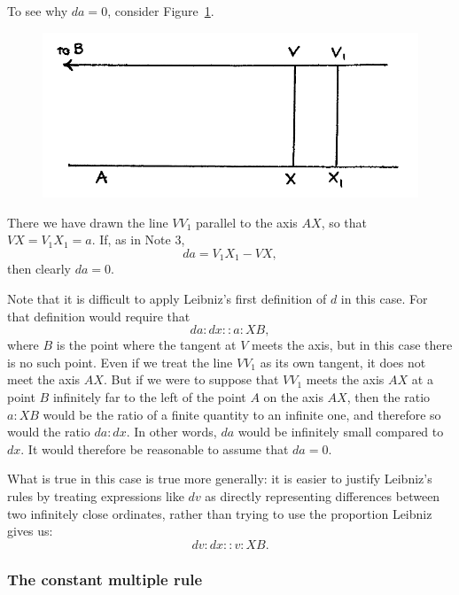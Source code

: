 \documentclass[polutonikogreek,english,twoside,openright]{article}
\begin{document}
To see why $da =0$, consider Figure~\ref{conrule}.
\begin{figure}[htp]
\begin{center}
\includegraphics[width=.75\textwidth]{fig/Figure12}
\caption{}
\label{conrule}
\vspace{-10pt}
\end{center}
\end{figure}
  There we have drawn the line $VV_1$ parallel to the axis $AX$, so that $VX =V_1X_1 = a$.   If, as in Note 3,
$$ da = V_1X_1 - VX,$$
then clearly $da =0$.

Note that it is difficult to apply Leibniz's first definition of $d$
in this case.  For that definition would require that
$$da \!:\! dx :: a \!:\! XB,$$ 
where $B$ is the point where the tangent at $V$ meets the axis, but in
this case there is no such point.  Even if we treat the line $VV_1$ as
its own tangent, it does not meet the axis $AX$.  But if we were to
suppose that $VV_1$ meets the axis $AX$ at a point $B$ infinitely far
to the left of the point $A$ on the axis $AX$, then the ratio
$a \!:\! XB$ would be the ratio of a finite quantity to an infinite
one, and therefore so would the ratio $da \!:\! dx.$ In other words,
$da$ would be infinitely small compared to $dx$.  It would therefore
be reasonable to assume that $da= 0$.


What is true in this case is true more generally: it is easier to
justify Leibniz's rules by treating expressions like $dv$ as directly
representing differences between two infinitely close ordinates,
rather than trying to use the proportion Leibniz gives us:
$$dv \!:\! dx :: v \!:\! XB.$$

\subsubsection*{The constant multiple rule}
\end{document}
